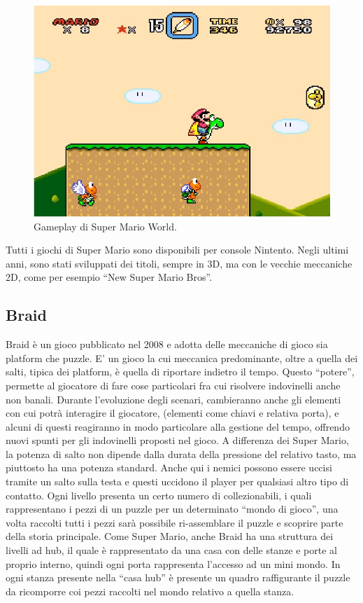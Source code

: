 \begin{figure}[h]
\centerline{\includegraphics[scale=0.50]{images/statoarte/smwgameplay.jpg}}
\caption{Gameplay di Super Mario World.}
\label{fig:smwgameplay}
\end{figure}

Tutti i giochi di Super Mario sono disponibili per console Nintento. Negli ultimi anni, sono stati sviluppati dei titoli, sempre in 3D, ma con le vecchie meccaniche 2D, come per esempio ``New Super Mario Bros''.



\subsection{Braid}
\label{sec:stato_arte_braid}

Braid è un gioco pubblicato nel 2008 e adotta delle meccaniche di gioco sia platform che puzzle. E' un gioco la cui meccanica predominante, oltre a quella dei salti, tipica dei platform, è quella di riportare indietro il tempo. Questo ``potere'', permette al giocatore di fare cose particolari fra cui risolvere indovinelli anche non banali. Durante l'evoluzione degli scenari, cambieranno anche gli elementi con cui potrà interagire il giocatore, (elementi come chiavi e relativa porta), e alcuni di questi reagiranno in modo particolare alla gestione del tempo, offrendo nuovi spunti per gli indovinelli proposti nel gioco. A differenza dei Super Mario, la potenza di salto non dipende dalla durata della pressione del relativo tasto, ma piuttosto ha una potenza standard. Anche qui i nemici possono essere uccisi tramite un salto sulla testa e questi uccidono il player per qualsiasi altro tipo di contatto. Ogni livello presenta un certo numero di collezionabili, i quali rappresentano i pezzi di un puzzle per un determinato ``mondo di gioco'', una volta raccolti tutti i pezzi sarà possibile ri-assemblare il puzzle e scoprire parte della storia principale. Come Super Mario, anche Braid ha una struttura dei livelli ad hub, il quale è rappresentato da una casa con delle stanze e porte al proprio interno, quindi ogni porta rappresenta l'accesso ad un mini mondo. In ogni stanza presente nella ``casa hub'' è presente un quadro raffigurante il puzzle da ricomporre coi pezzi raccolti nel mondo relativo a quella stanza.

